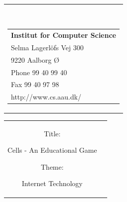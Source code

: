 

{}
\thispagestyle{empty}
\begin{nopagebreak}
{\samepage 
\begin{tabular}{r}
\parbox{\textwidth}{  \\
\hfill \parbox{8cm}{\begin{tabular}{l} %
{\small \textbf{Institut for Computer Science}}\\
{\small Selma Lagerlöfs Vej 300} \\
{\small 9220 Aalborg Ø} \\
{\small Phone 99 40 99 40} \\
{\small Fax 99 40 97 98} \\
{\small http://www.cs.aau.dk/}
\end{tabular}}}

\end{tabular}

\begin{tabular}{cc}
\parbox{7cm}{
\begin{description}

\item { Title:} 

Cells - An Educational Game\\
  
\item { Theme:} 

Internet Technology

\end{description}

\parbox{8cm}{

}}
\end{tabular}}
\end{nopagebreak}
